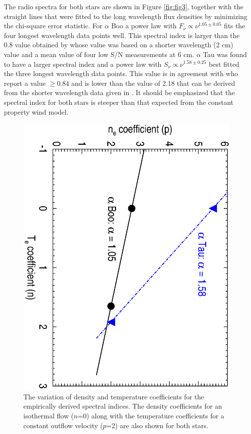 \documentclass[iop]{emulateapj}
\begin{document}
The radio spectra for both stars are shown in Figure \ref{fig:fig3}, together with the straight lines that were fitted to the long wavelength flux densities by minimizing the chi-square error statistic. For $\alpha$ Boo a power law with $F_{\nu} \propto \nu ^{1.05 \pm 0.05}$ fits the four longest wavelength data points well. This spectral index is larger than the 0.8 value obtained by \cite{1986AJ.....91..602D} whose value was based on a shorter wavelength (2 cm) value and a mean value of four low S/N measurements at 6 cm. $\alpha$ Tau was found to have a larger spectral index and a power law with $S_{\nu} \propto \nu ^{1.58 \pm 0.25}$ best fitted the three longest wavelength data points. This value is in agreement with \cite{1986AJ.....91..602D} who report a value $\ge 0.84$ and is lower than the value of 2.18 that can be derived from the shorter wavelength data given in \cite{2007ApJ...655..946W}. It should be emphasized that the spectral index for both stars is steeper than that expected from the constant property wind model. 

\begin{figure}
\includegraphics[trim = 0mm 11mm 0mm 21mm, clip,scale=0.4,angle=90]{fig4.ps}
\caption{The variation of density and temperature coefficients for the empirically derived spectral indices. The density coefficients for an isothermal flow ($n$=0) along with the temperature coefficients for a constant outflow velocity ($p$=2) are also shown for both stars.}
\label{fig:fig4}
\end{figure}
\end{document}
